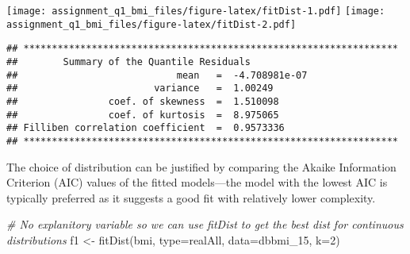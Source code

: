 \documentclass[
]{article}
\newenvironment{Shaded}{\begin{snugshade}}{\end{snugshade}}
\newcommand{\AttributeTok}[1]{\textcolor[rgb]{0.77,0.63,0.00}{#1}}
\newcommand{\CommentTok}[1]{\textcolor[rgb]{0.56,0.35,0.01}{\textit{#1}}}
\newcommand{\DecValTok}[1]{\textcolor[rgb]{0.00,0.00,0.81}{#1}}
\newcommand{\FunctionTok}[1]{\textcolor[rgb]{0.00,0.00,0.00}{#1}}
\newcommand{\NormalTok}[1]{#1}
\newcommand{\OtherTok}[1]{\textcolor[rgb]{0.56,0.35,0.01}{#1}}
\newcommand{\StringTok}[1]{\textcolor[rgb]{0.31,0.60,0.02}{#1}}
\begin{document}
\texttt{[image: assignment\_q1\_bmi\_files/figure-latex/fitDist-1.pdf]}
\texttt{[image: assignment\_q1\_bmi\_files/figure-latex/fitDist-2.pdf]}

\begin{verbatim}
## ******************************************************************
##        Summary of the Quantile Residuals
##                            mean   =  -4.708981e-07 
##                        variance   =  1.00249 
##                coef. of skewness  =  1.510098 
##                coef. of kurtosis  =  8.975065 
## Filliben correlation coefficient  =  0.9573336 
## ******************************************************************
\end{verbatim}

The choice of distribution can be justified by comparing the Akaike
Information Criterion (AIC) values of the fitted models---the model with
the lowest AIC is typically preferred as it suggests a good fit with
relatively lower complexity.

\begin{Shaded}
\begin{Highlighting}[]
\CommentTok{\# No explanitory variable so we can use fitDist to get the best dist for continuous distributions}
\NormalTok{f1 }\OtherTok{\textless{}{-}} \FunctionTok{fitDist}\NormalTok{(bmi, }\AttributeTok{type=}\StringTok{\textquotesingle{}realAll\textquotesingle{}}\NormalTok{, }\AttributeTok{data=}\NormalTok{dbbmi\_15, }\AttributeTok{k=}\DecValTok{2}\NormalTok{)}
\end{Highlighting}
\end{Shaded}
\end{document}
